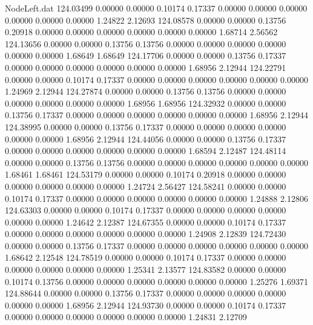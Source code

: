 \begin{filecontents}{NodeLeft.dat}
 124.03499    0.00000    0.00000     0.10174    0.17337    0.00000    0.00000    0.00000    0.00000    0.00000    0.00000    1.24822    2.12693
 124.08578    0.00000    0.00000     0.13756    0.20918    0.00000    0.00000    0.00000    0.00000    0.00000    0.00000    1.68714    2.56562
 124.13656    0.00000    0.00000     0.13756    0.13756    0.00000    0.00000    0.00000    0.00000    0.00000    0.00000    1.68649    1.68649
 124.17706    0.00000    0.00000     0.13756    0.17337    0.00000    0.00000    0.00000    0.00000    0.00000    0.00000    1.68956    2.12944
 124.22791    0.00000    0.00000     0.10174    0.17337    0.00000    0.00000    0.00000    0.00000    0.00000    0.00000    1.24969    2.12944
 124.27874    0.00000    0.00000     0.13756    0.13756    0.00000    0.00000    0.00000    0.00000    0.00000    0.00000    1.68956    1.68956
 124.32932    0.00000    0.00000     0.13756    0.17337    0.00000    0.00000    0.00000    0.00000    0.00000    0.00000    1.68956    2.12944
 124.38995    0.00000    0.00000     0.13756    0.17337    0.00000    0.00000    0.00000    0.00000    0.00000    0.00000    1.68956    2.12944
 124.44056    0.00000    0.00000     0.13756    0.17337    0.00000    0.00000    0.00000    0.00000    0.00000    0.00000    1.68594    2.12487
 124.48114    0.00000    0.00000     0.13756    0.13756    0.00000    0.00000    0.00000    0.00000    0.00000    0.00000    1.68461    1.68461
 124.53179    0.00000    0.00000     0.10174    0.20918    0.00000    0.00000    0.00000    0.00000    0.00000    0.00000    1.24724    2.56427
 124.58241    0.00000    0.00000     0.10174    0.17337    0.00000    0.00000    0.00000    0.00000    0.00000    0.00000    1.24888    2.12806
 124.63303    0.00000    0.00000     0.10174    0.17337    0.00000    0.00000    0.00000    0.00000    0.00000    0.00000    1.24642    2.12387
 124.67355    0.00000    0.00000     0.10174    0.17337    0.00000    0.00000    0.00000    0.00000    0.00000    0.00000    1.24908    2.12839
 124.72430    0.00000    0.00000     0.13756    0.17337    0.00000    0.00000    0.00000    0.00000    0.00000    0.00000    1.68642    2.12548
 124.78519    0.00000    0.00000     0.10174    0.17337    0.00000    0.00000    0.00000    0.00000    0.00000    0.00000    1.25341    2.13577
 124.83582    0.00000    0.00000     0.10174    0.13756    0.00000    0.00000    0.00000    0.00000    0.00000    0.00000    1.25276    1.69371
 124.88644    0.00000    0.00000     0.13756    0.17337    0.00000    0.00000    0.00000    0.00000    0.00000    0.00000    1.68956    2.12944
 124.93730    0.00000    0.00000     0.10174    0.17337    0.00000    0.00000    0.00000    0.00000    0.00000    0.00000    1.24831    2.12709

\end{filecontents}
